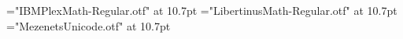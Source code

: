 \begingroup
\font\slfigPBaseMath="IBMPlexMath-Regular.otf" at 10.7pt
\font\slfigPBinaryMath="LibertinusMath-Regular.otf" at 10.7pt
\font\slfigPTotalMath="MezenetsUnicode.otf" at 10.7pt
\def\slfigPAlpha{\mathord{\hbox{\slfigPBaseMath\char"1D6FC}}}
\def\slfigPCountN{\mathord{\hbox{\slfigPBaseMath\char"1D45B}}}
\def\slfigPPlus{\mathbin{\hbox{\slfigPBinaryMath\char"002B}}}
\def\slfigPTotalN{\mathord{\hbox{\slfigPTotalMath\char"004E}}}
